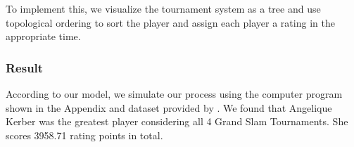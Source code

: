 To implement this, we visualize the tournament system as a tree and use topological ordering \cite{toposort} to sort the player and assign each player a rating in the appropriate time. %

\subsubsection{Result}

According to our model, we simulate our process using the computer program shown in the Appendix and dataset provided by \cite{WTA_data}. We found that Angelique Kerber was the greatest player considering all 4 Grand Slam Tournaments. She scores 3958.71 rating points in total. %